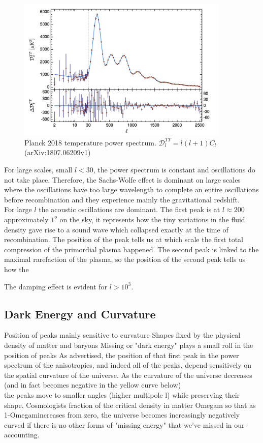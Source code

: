\documentclass{article}
\begin{document}
\begin{figure}
\includegraphics[width=0.9\textwidth]{planck2018}
\caption{Planck 2018 temperature power spectrum. $\mathcal{D}^{TT}_l = l(l+1)C_l$ (arXiv:1807.06209v1)}
\label{temp_pow_spect}
\end{figure}
%
%
%
For large scales, small $l<30$, the power spectrum is constant and oscillations do not take place.
Therefore, the Sachs-Wolfe effect is dominant on large scales where the oscillations have too large wavelength to complete an entire oscillations before recombination and they experience mainly the gravitational redshift.\\
For large $l$ the acoustic oscillations are dominant.
The first peak is at $l \approx 200$ approximately $1 ^o$ on the sky, it represents how the tiny variations in the fluid density gave rise to a sound wave which collapsed exactly at the time of recombination.
The position of the peak tells us at which scale the first total compression of the primordial plasma happened.
The second peak is linked to the maximal rarefaction of the plasma, so the position of the second peak tells us how the 



The damping effect is evident for $l>10^{3}$.\\

\subsection{Dark Energy and Curvature}

Position of peaks mainly sensitive to curvature
Shapes fixed by the physical density of matter and baryons
Missing or "dark energy" plays a small roll in the position of peaks
As advertised, the position of that first peak in the power spectrum of the anisotropies, and indeed all of the peaks, depend sensitively on the spatial curvature of the universe.   As the curvature of the universe decreases (and in fact becomes negative in the yellow curve below)\\
the peaks move to smaller angles (higher multipole l) while preserving their shape.  Cosmologists fraction of the critical density in matter Omegam so that as 1-Omegamincreases from zero, the universe becomes increasingly negatively curved if there is no other forms of "missing energy" that we've missed in our accounting.
\end{document}
